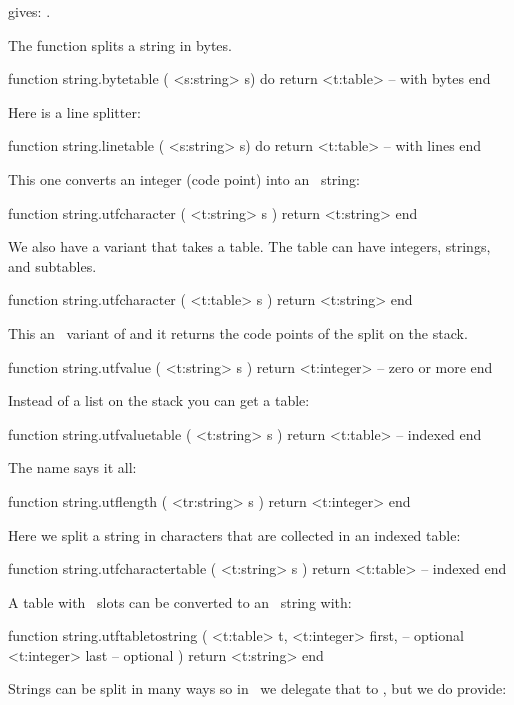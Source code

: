 \typebuffer

gives: \inlinebuffer.

The  function splits a string in bytes.

\starttyping[option=LUA]
function string.bytetable ( <s:string> s) do
    return <t:table> -- with bytes
end
\stoptyping

Here is a line splitter:

\starttyping[option=LUA]
function string.linetable  ( <s:string> s) do
    return <t:table> -- with lines
end
\stoptyping

This one converts an integer (code point) into an \UTF\ string:

\starttyping[option=LUA]
function string.utfcharacter ( <t:string> s )
    return <t:string>
end
\stoptyping

We also have a variant that takes a table. The table can have integers, strings,
and subtables.

\starttyping[option=LUA]
function string.utfcharacter ( <t:table> s )
    return <t:string>
end
\stoptyping

This an \ variant of  and it returns the code points of
the split on the stack.

\starttyping[option=LUA]
function string.utfvalue ( <t:string> s )
    return <t:integer> -- zero or more
end
\stoptyping

Instead of a list on the stack you can get a table:

\starttyping[option=LUA]
function string.utfvaluetable ( <t:string> s )
    return <t:table> -- indexed
end
\stoptyping

The name says it all:

\starttyping[option=LUA]
function string.utflength ( <tr:string> s )
    return <t:integer>
end
\stoptyping

Here we split a string in characters that are collected in an indexed table:

\starttyping[option=LUA]
function string.utfcharactertable ( <t:string> s )
    return <t:table> -- indexed
end
\stoptyping

A table with \UNICODE\ slots can be converted to an \UTF\ string with:

\starttyping[option=LUA]
function string.utftabletostring (
    <t:table>   t,
    <t:integer> first, -- optional
    <t:integer> last   -- optional
)
    return <t:string>
end
\stoptyping

Strings can be split in many ways so in \CONTEXT\ we delegate that to \LUA,
but we do provide:

